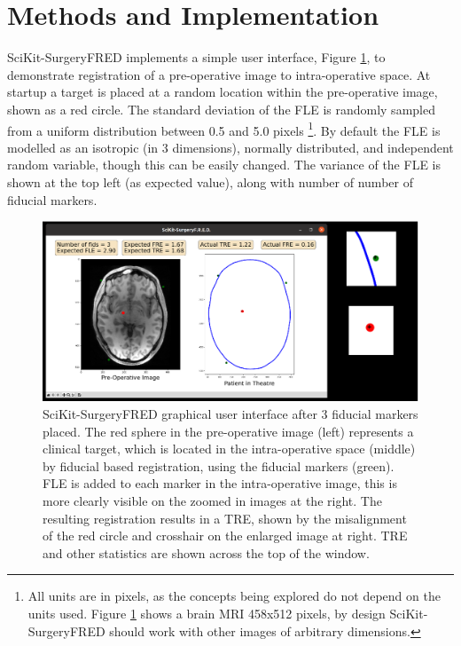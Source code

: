 \section{Methods and Implementation}
SciKit-SurgeryFRED implements a simple user interface, Figure \ref{fig:surgery_fred}, to demonstrate registration of a pre-operative image to intra-operative space. At startup a target is placed at a random location within the pre-operative image, shown as a red circle. The standard deviation of the \gls{FLE} is randomly sampled from a uniform distribution 
between 0.5 and 5.0 pixels \footnote{All units are in pixels, as the concepts being explored do not depend on the units used. Figure \ref{fig:surgery_fred} shows a brain MRI 458x512 pixels, by design SciKit-SurgeryFRED should work with other images of arbitrary dimensions.}. By default the \gls{FLE} is modelled as an isotropic (in 3 dimensions), normally distributed, and independent random variable, though this can be easily changed. The variance of the \gls{FLE} is shown at the top left (as expected value), along with number of number of fiducial markers. 

\begin{figure}
	\begin{center}
	\includegraphics[width=0.9\linewidth]{scikit-surgeryfred_gui.eps}
		\caption{\label{fig:surgery_fred}SciKit-SurgeryFRED graphical user interface after 3 fiducial markers placed. The red sphere in the pre-operative image (left) represents a clinical target, which is located in the
		intra-operative space (middle) by fiducial based registration, using the fiducial markers (green). FLE is added to each marker in the intra-operative image, this is more clearly visible on the zoomed in images at the right. The resulting registration results in a TRE, shown by the misalignment of the red circle and crosshair 
		on the enlarged image at right. TRE and other statistics are shown across the top
		of the window.}
	\end{center}
\end{figure}

